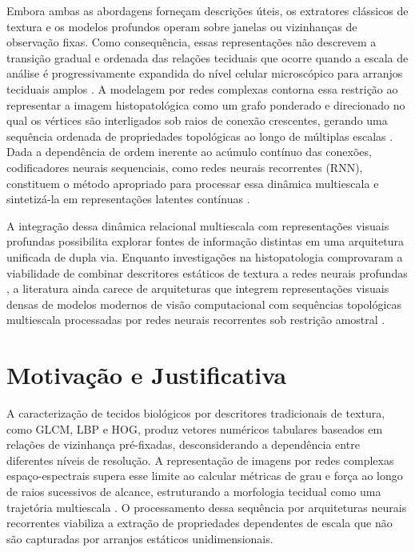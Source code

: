 Embora ambas as abordagens forneçam descrições úteis, os extratores clássicos de textura e os modelos profundos operam sobre janelas ou vizinhanças de observação fixas. Como consequência, essas representações não descrevem a transição gradual e ordenada das relações teciduais que ocorre quando a escala de análise é progressivamente expandida do nível celular microscópico para arranjos teciduais amplos \cite{BACKES2013168,Scabini_2020}. A modelagem por redes complexas contorna essa restrição ao representar a imagem histopatológica como um grafo ponderado e direcionado no qual os vértices são interligados sob raios de conexão crescentes, gerando uma sequência ordenada de propriedades topológicas ao longo de múltiplas escalas \cite{Scabini_2020,ribas2024colorspectral}. Dada a dependência de ordem inerente ao acúmulo contínuo das conexões, codificadores neurais sequenciais, como redes neurais recorrentes (RNN), constituem o método apropriado para processar essa dinâmica multiescala e sintetizá-la em representações latentes contínuas \cite{hochreiter1997long,schuster1997bidirectional,lin2022mslstm}.

A integração dessa dinâmica relacional multiescala com representações visuais profundas possibilita explorar fontes de informação distintas em uma arquitetura unificada de dupla via. Enquanto investigações na histopatologia comprovaram a viabilidade de combinar descritores estáticos de textura a redes neurais profundas \cite{huang2022fusing,li2025fusion}, a literatura ainda carece de arquiteturas que integrem representações visuais densas de modelos modernos de visão computacional com sequências topológicas multiescala processadas por redes neurais recorrentes sob restrição amostral \cite{srinidhi2021deep,oliveira2025hybrid,brussee2025graph}.

\section{Motivação e Justificativa}
\label{sec:motivacao-justificativa}

A caracterização de tecidos biológicos por descritores tradicionais de textura, como GLCM, LBP e HOG, produz vetores numéricos tabulares baseados em relações de vizinhança pré-fixadas, desconsiderando a dependência entre diferentes níveis de resolução. A representação de imagens por redes complexas espaço-espectrais supera esse limite ao calcular métricas de grau e força ao longo de raios sucessivos de alcance, estruturando a morfologia tecidual como uma trajetória multiescala \cite{Scabini_2020,ribas2024colorspectral}. O processamento dessa sequência por arquiteturas neurais recorrentes viabiliza a extração de propriedades dependentes de escala que não são capturadas por arranjos estáticos unidimensionais.

